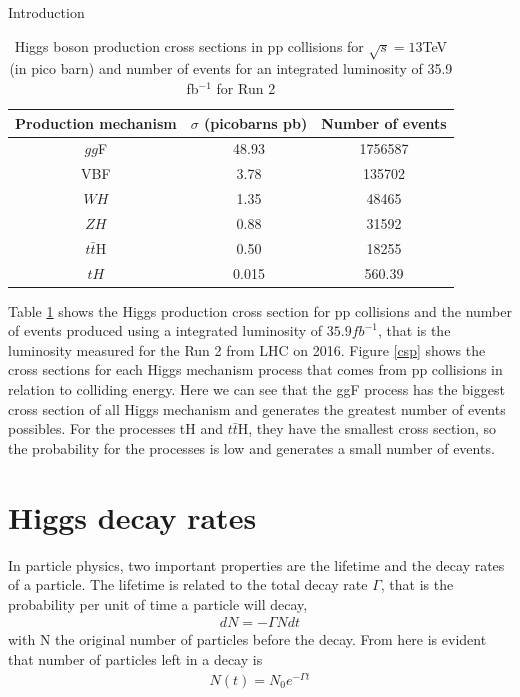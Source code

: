 \begin{chapter}{Introduction}
\begin{table}[ht]
\centering
\caption[Higgs boson production cross sections in pp collisions number of events for  35.9 fb$^{-1}$ ]{	Higgs boson production cross sections in pp collisions for $\sqrt{s}=13$TeV (in pico barn) and number of events for an integrated luminosity of 35.9 fb$^{-1}$ for Run 2  \cite{pd}}
\begin{tabular}{|c|c|c|}
\hline
Production mechanism &
$\sigma$ (picobarns pb) & Number of events \\
\hline
$gg$F & 48.93 & 1756587\\
\hline
VBF & 3.78 & 135702\\
\hline
$WH$ & 1.35 & 48465\\
\hline
$ZH$ &0.88 & 31592\\
\hline
$t\bar{t}$H & 0.50 & 18255\\
\hline
$tH$	& 0.015 & 560.39\\
\hline
\end{tabular}
\label{crt}
\end{table}

 Table \ref{crt} shows the Higgs production cross section for pp collisions and the number of events produced using a integrated luminosity of $35.9 fb^{-1}$, that is the luminosity measured for the Run 2 from LHC on 2016\cite{pd}. Figure \ref{csp} shows the cross sections for each Higgs mechanism process  that comes from pp collisions in relation to colliding energy.
Here we can see that the ggF process has the biggest cross section of all Higgs mechanism and generates the greatest number of events possibles. For the processes tH and $t\bar{t}$H, they have the smallest cross section, so the probability for the processes is low and generates a small number of events. 
\pagebreak

\section{Higgs decay rates}
In particle physics, two important properties are the lifetime and the decay rates of a particle. The lifetime is related to the total decay rate $\Gamma$, that is the probability per unit of time a particle will decay, 
\begin{align}
  dN=-\Gamma N dt
\end{align}
with N the original number of particles before the decay. From here is evident that number of particles left in a decay is 
\begin{align}
N(t)=N_0 e^{-\Gamma t}
\end{align}


\end{chapter}
